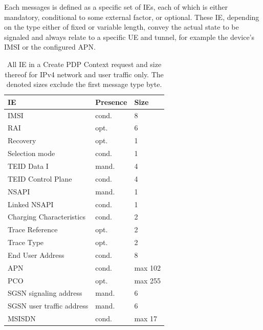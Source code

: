 Each messages is defined as a specific set of \glspl{IE}, each of which is either mandatory, conditional to some external factor, or optional. These \gls{IE}, depending on the type either of fixed or variable length, convey the actual state to be signaled and always relate to a specific \gls{UE} and tunnel, for example the device's \gls{IMSI} or the configured \gls{APN}.

\begin{table}[htbp]
\caption{All \gls{IE} in a Create \gls{PDP} Context request and size thereof for \gls{IPv4} network and user traffic only. The denoted sizes exclude the first message type byte.}
\label{c4:tab:createrequestelements}
	\begin{tabu} to 0.49\textwidth{X[2.5]X[1.2]X[0.7]}
		\toprule
		\textbf{\gls{IE}} & \textbf{Presence} & \textbf{Size}\\
		\midrule
		\gls{IMSI} & cond. & \SI{8}{\byte} \\ 
		\acrshort{RAI} & opt. & \SI{6}{\byte} \\
		Recovery & opt. & \SI{1}{\byte} \\
		Selection mode	& cond. & \SI{1}{\byte} \\
		\gls{TEID} Data I & mand. & \SI{4}{\byte} \\
		\gls{TEID} Control Plane & cond. & \SI{4}{\byte} \\
		\gls{NSAPI} & mand. & \SI{1}{\byte} \\
		Linked \gls{NSAPI} & cond. & \SI{1}{\byte} \\
		Charging Characteristics & cond. & \SI{2}{\byte} \\
		Trace Reference & opt. & \SI{2}{\byte} \\
		Trace Type & opt. & \SI{2}{\byte} \\
		End User Address & cond. & \SI{8}{\byte} \\
		\gls{APN} & cond. & max \SI{102}{\byte} \\ %
		\acrshort{PCO} & opt. & max \SI{255}{\byte} \\ %
		\gls{SGSN} signaling address & mand.  & \SI{6}{\byte} \\ %
		\gls{SGSN} user traffic address & mand. & \SI{6}{\byte} \\ %
		\gls{MSISDN} & cond. & max \SI{17}{\byte} \\ %

\end{tabu}
\end{table}
